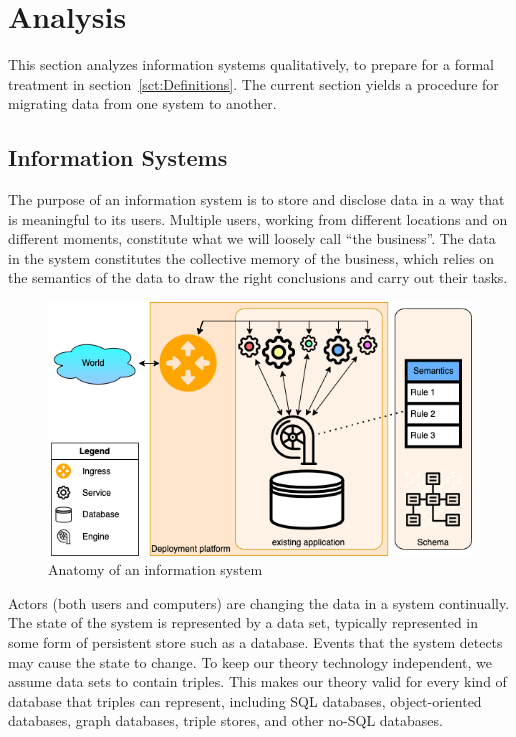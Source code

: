 \documentclass[runningheads]{llncs}
\begin{document}
\section{Analysis}
\label{sct:Analysis}
   This section analyzes information systems qualitatively, to prepare for a formal treatment in section~\ref{sct:Definitions}.
   The current section yields a procedure for migrating data from one system to another.
\subsection{Information Systems}
   The purpose of an information system is to store and disclose data in a way that is meaningful to its users.
   Multiple users, working from different locations and on different moments, constitute what we will loosely call ``the business''.
   The data in the system constitutes the collective memory of the business,
   which relies on the semantics of the data to draw the right conclusions and carry out their tasks.
\begin{figure}[bht]
   \begin{center}
     \includegraphics[scale=.45]{figures/datamigration-Pre-migration.png}
   \end{center}
\caption{Anatomy of an information system}
\label{fig:pre-migration}
\end{figure}

   Actors (both users and computers) are changing the data in a system continually.
   The state of the system is represented by a data set, typically represented in some form of persistent store such as a database.
   Events that the system detects may cause the state to change.
   To keep our theory technology independent, we assume data sets to contain triples.
   This makes our theory valid for every kind of database that triples can represent,
   including SQL databases, object-oriented databases, graph databases, triple stores, and other no-SQL databases.
\end{document}
